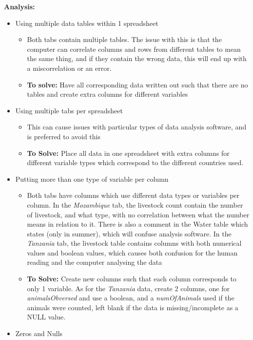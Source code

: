 \documentclass{article}
\begin{document}
\textbf{Analysis:}
\begin{itemize}
    \item Using multiple data tables within 1 spreadsheet
    \begin{itemize}
        \item Both tabs contain multiple tables. The issue with this is that the computer can correlate columns and rows from different tables to mean the same thing, and if they contain the wrong data, this will end up with a miscorrelation or an error.
        \item \textbf{To solve:} Have all corresponding data written out such that there are no tables and create extra columns for different variables
    \end{itemize}
    \item Using multiple tabs per spreadsheet
    \begin{itemize}
        \item This can cause issues with particular types of data analysis software, and is preferred to avoid this
        \item \textbf{To Solve:} Place all data in one spreadsheet with extra columns for different variable types which correspond to the different countries used.
    \end{itemize}
    \item Putting more than one type of variable per column
    \begin{itemize}
        \item Both tabs have columns which use different data types or variables per column. In the \textit{Mozambique} tab, the livestock count contain the number of livestock, and what type, with no correlation between what the number means in relation to it. There is also a comment in the Water table which states (only in summer), which will confuse analysis software. In the \textit{Tanzania} tab, the livestock table contains columns with both numerical values and boolean values, which causes both confusion for the human reading and the computer analysing the data
        \item \textbf{To Solve:} Create new columns such that each column corresponds to only 1 variable. As for the \textit{Tanzania} data, create 2 columns, one for \textit{animalsObversed} and use a boolean, and a \textit{numOfAnimals} used if the animals were counted, left blank if the data is missing/incomplete as a NULL value.
    \end{itemize}
    \item Zeros and Nulls

\end{itemize}
\end{document}
